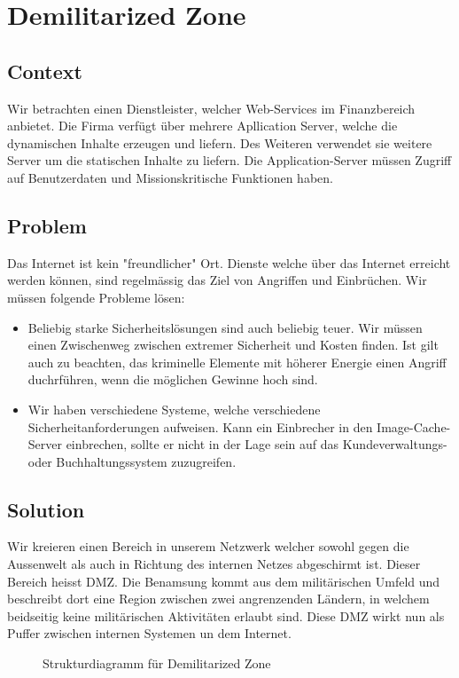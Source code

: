 \chapter{Demilitarized Zone}

\section{Context}
Wir betrachten einen Dienstleister, welcher Web-Services im Finanzbereich anbietet. Die Firma verfügt über mehrere Apllication Server, welche die dynamischen Inhalte erzeugen und liefern. Des Weiteren verwendet sie weitere Server um die statischen Inhalte zu liefern. Die Application-Server müssen Zugriff auf Benutzerdaten und Missionskritische Funktionen haben.

\section{Problem}
Das Internet ist kein "freundlicher" Ort. Dienste welche über das Internet erreicht werden können, sind regelmässig das Ziel von Angriffen und Einbrüchen. Wir müssen folgende Probleme lösen:
\begin{itemize}
  \item Beliebig starke Sicherheitslösungen sind auch beliebig teuer. Wir müssen einen Zwischenweg zwischen extremer Sicherheit und Kosten finden. Ist gilt auch zu beachten, das kriminelle Elemente mit höherer Energie einen Angriff duchrführen, wenn die möglichen Gewinne hoch sind.
  \item Wir haben verschiedene Systeme, welche verschiedene Sicherheitanforderungen aufweisen. Kann ein Einbrecher in den Image-Cache-Server einbrechen, sollte er nicht in der Lage sein auf das Kundeverwaltungs- oder Buchhaltungssystem zuzugreifen.
\end{itemize}

\section{Solution}
Wir kreieren einen Bereich in unserem Netzwerk welcher sowohl gegen die Aussenwelt als auch in Richtung des internen Netzes abgeschirmt ist. Dieser Bereich heisst DMZ. Die Benamsung kommt aus dem militärischen Umfeld und beschreibt dort eine Region zwischen zwei angrenzenden Ländern, in welchem beidseitig keine militärischen Aktivitäten erlaubt sind. Diese DMZ wirkt nun als Puffer zwischen internen Systemen un dem Internet.

\begin{figure}[H]
  \centering
  
  \caption{Strukturdiagramm f\"ur Demilitarized Zone}
\end{figure}

